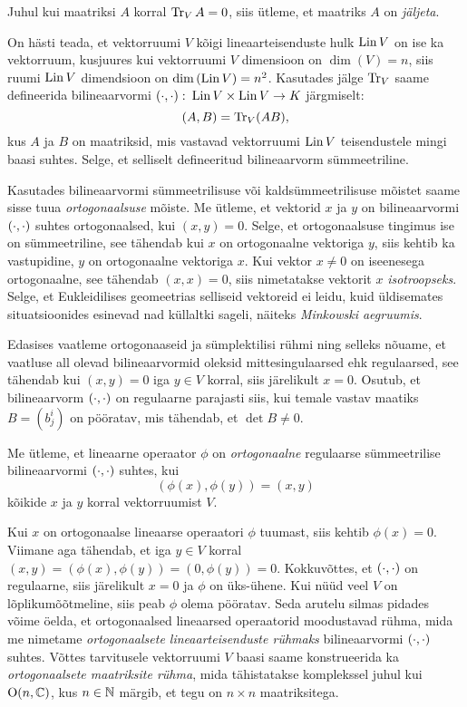 Juhul kui maatriksi $A$ korral $\operatorname{Tr}_V A = 0$, siis ütleme, et
maatriks $A$ on \emph{jäljeta}.

\begin{naide}
    On hästi teada, et vektorruumi $V$ kõigi lineaarteisenduste hulk $\operatorname{Lin} V$
    on ise ka vektorruum, kusjuures kui vektorruumi $V$ dimensioon
    on $\dim(V) = n$, siis ruumi $\operatorname{Lin} V$ dimendsioon on
    $\dim \left(\operatorname{Lin} V\right) = n^2$. Kasutades jälge $\operatorname{Tr}_V$ saame
    defineerida bilineaarvormi
    $\left( \cdot, \cdot \right) \colon \operatorname{Lin} V \times \operatorname{Lin} V \to K$ järgmiselt:
    \[ (A, B) = \operatorname{Tr}_V(AB), \]
    kus $A$ ja $B$ on maatriksid, mis vastavad vektorruumi $\operatorname{Lin} V$
    teisendustele mingi baasi suhtes. Selge, et selliselt defineeritud
    bilineaarvorm sümmeetriline.
\end{naide}

Kasutades bilineaarvormi sümmeetrilisuse või kaldsümmeetrilisuse mõistet
saame sisse tuua \emph{ortogonaalsuse} mõiste. Me ütleme, et vektorid $x$ ja $y$
on bilineaarvormi $\left( \cdot, \cdot \right)$ suhtes ortogonaalsed, kui $(x, y) = 0$. Selge, et
ortogonaalsuse tingimus ise on sümmeetriline, see tähendab kui $x$ on
ortogonaalne vektoriga $y$, siis kehtib ka vastupidine, $y$ on ortogonaalne
vektoriga $x$. Kui vektor $x \neq 0$ on iseenesega ortogonaalne, see tähendab
$(x, x) = 0$, siis nimetatakse vektorit $x$ \emph{isotroopseks}. Selge, et
Eukleidilises geomeetrias selliseid vektoreid ei leidu, kuid üldisemates
situatsioonides esinevad nad küllaltki sageli, näiteks
\emph{Minkowski aegruumis}.

Edasises vaatleme ortogonaaseid ja sümplektilisi rühmi ning selleks
nõuame, et vaatluse all olevad bilineaarvormid oleksid mittesingulaarsed
ehk regulaarsed, see tähendab kui $(x, y) = 0$ iga $y \in V$ korral, siis
järelikult $x = 0$. Osutub, et bilineaarvorm $\left( \cdot, \cdot \right)$ on regulaarne parajasti
siis, kui temale vastav maatiks $B = (b^i_j)$ on pööratav, mis tähendab,
et $\det B \neq 0$.

\begin{dfn}
    Me ütleme, et lineaarne operaator $\phi$ on \emph{ortogonaalne}
    regulaarse sümmeetrilise bilineaarvormi $\left( \cdot, \cdot \right)$ suhtes, kui
    \[ (\phi(x), \phi(y)) = (x, y) \]
    kõikide $x$ ja $y$ korral vektorruumist $V$.
\end{dfn}

Kui $x$ on ortogonaalse lineaarse operaatori $\phi$ tuumast, siis
kehtib $\phi(x) = 0$. Viimane aga tähendab, et iga $y \in V$ korral
$(x, y) = (\phi(x), \phi(y)) = (0, \phi(y)) = 0$. Kokkuvõttes,
et $\left( \cdot, \cdot \right)$ on regulaarne, siis järelikult $x = 0$ ja $\phi$ on üks-ühene.
Kui nüüd veel $V$ on lõplikumõõtmeline, siis peab $\phi$ olema pööratav.
Seda arutelu silmas pidades võime öelda, et ortogonaalsed lineaarsed
operaatorid moodustavad rühma, mida me nimetame \emph{ortogonaalsete
lineaarteisenduste rühmaks} bilineaarvormi $\left( \cdot, \cdot \right)$ suhtes.
Võttes tarvitusele vektorruumi $V$ baasi saame konstrueerida ka
\emph{ortogonaalsete maatriksite rühma}, mida tähistatakse komplekssel juhul
kui $\operatorname{O}(n, \mathbb{C})$, kus $n \in \mathbb{N}$ märgib, et tegu on $n \times n$ maatriksitega.

